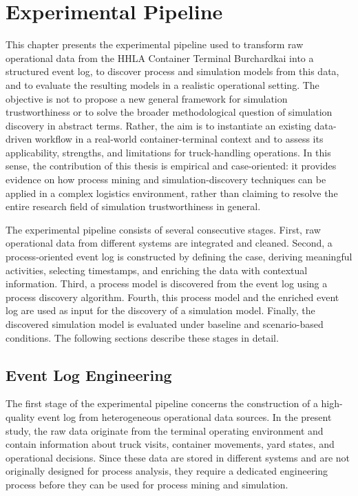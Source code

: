 \section{Experimental Pipeline}

This chapter presents the experimental pipeline used to transform raw operational data from the HHLA Container Terminal Burchardkai into a structured event log, to discover process and simulation models from this data, and to evaluate the resulting models in a realistic operational setting. The objective is not to propose a new general framework for simulation trustworthiness or to solve the broader methodological question of simulation discovery in abstract terms. Rather, the aim is to instantiate an existing data-driven workflow in a real-world container-terminal context and to assess its applicability, strengths, and limitations for truck-handling operations. In this sense, the contribution of this thesis is empirical and case-oriented: it provides evidence on how process mining and simulation-discovery techniques can be applied in a complex logistics environment, rather than claiming to resolve the entire research field of simulation trustworthiness in general.

The experimental pipeline consists of several consecutive stages. First, raw operational data from different systems are integrated and cleaned. Second, a process-oriented event log is constructed by defining the case, deriving meaningful activities, selecting timestamps, and enriching the data with contextual information. Third, a process model is discovered from the event log using a process discovery algorithm. Fourth, this process model and the enriched event log are used as input for the discovery of a simulation model. Finally, the discovered simulation model is evaluated under baseline and scenario-based conditions. The following sections describe these stages in detail.

\subsection{Event Log Engineering}

The first stage of the experimental pipeline concerns the construction of a high-quality event log from heterogeneous operational data sources. In the present study, the raw data originate from the terminal operating environment and contain information about truck visits, container movements, yard states, and operational decisions. Since these data are stored in different systems and are not originally designed for process analysis, they require a dedicated engineering process before they can be used for process mining and simulation.


